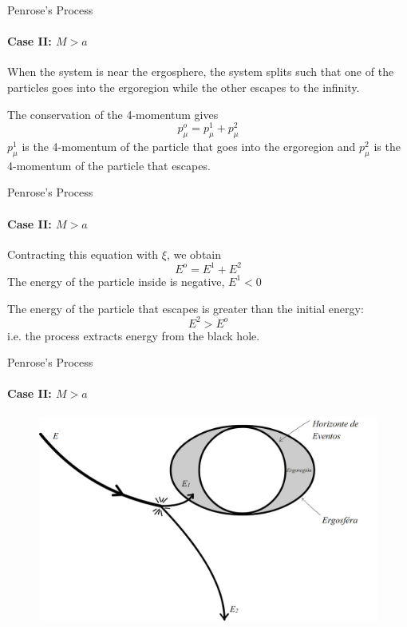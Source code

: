 \documentclass{beamer}
\begin{document}
     \begin{darkframes}
        
        
        \begin{frame}{Penrose's Process}
       	\framesubtitle{Case II: $M>a$}
           When the system is near the ergosphere, the system splits such that
one of the particles goes into the ergoregion while the other escapes
to the infinity.\\
\pause
\bigskip

The conservation of the 4-momentum gives
$$p_{\mu}^{o}=p_{\mu}^{1}+p_{\mu}^{2}$$
\pause
$p_{\mu}^{1}$ is the 4-momentum of the particle that goes into
the ergoregion and $p_{\mu}^{2}$ is the 4-momentum of the particle
that escapes.
        \end{frame}
        
        \begin{frame}{Penrose's Process}
       	\framesubtitle{Case II: $M>a$}
          	Contracting this equation with $\xi$, we obtain
            $$E^{o}=E^{1}+E^{2}$$
			\pause
            The energy of the particle inside is negative, $E^{1}<0$
            \pause
            \bigskip
            
            The energy of the particle that escapes is greater
than the initial energy:
$$E^{2}>E^{o}$$
i.e. the process extracts energy from the black hole.
        \end{frame}
        
        \end{darkframes}
    
        \begin{frame}{Penrose's Process}
         \framesubtitle{Case II: $M>a$}
        	\begin{center}
				\begin{figure}
				\includegraphics[scale=0.75] {figures/fig41.jpg}
				\end{figure}
			\end{center}	
        \end{frame}
  
\end{document}
